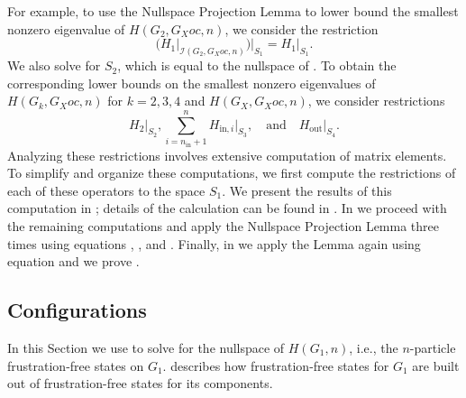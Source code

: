 \documentclass[../thesis-main/thesis-main]{subfiles}
\begin{document}
For example, to use the Nullspace Projection Lemma to lower bound the smallest nonzero eigenvalue of $H(G_{2},G_Xoc,n)$, we consider the restriction 
\begin{equation}
  \Big(H_{1}\big|_{\mathcal{I}(G_{2},G_Xoc,n)}\Big)\Big|_{S_{1}}
  =H_{1}\big|_{S_{1}}.\label{eq:H1_restriction}
\end{equation}
We also solve for $S_2$, which is equal to the nullspace of . To obtain the corresponding lower bounds on the smallest nonzero eigenvalues of $H(G_{k},G_Xoc,n)$ for $k=2,3,4$ and $H(G_X,G_Xoc,n)$, we consider restrictions 
\[
  H_{2}\big|_{S_{2}},
  \sum_{i=n_{\text{in}}+1}^{n}H_{\text{in},i}\big|_{S_{3}},\quad\text{and}\quad
  H_{\text{out}}\big|_{S_{4}}.
\]
Analyzing these restrictions involves extensive computation of matrix elements. To simplify and organize these computations, we first compute the restrictions of each of these operators to the space $S_{1}$. We present the results of this computation in ; details of the calculation can be found in . In  we proceed with the remaining computations and apply the Nullspace Projection Lemma three times using equations , , and . Finally, in  we apply the Lemma again using equation  and we prove .



\subsection{Configurations}

In this Section we use  to solve for the nullspace of $H(G_{1},n)$, i.e., the $n$-particle frustration-free states on $G_{1}$.  describes how frustration-free states for $G_1$ are built out of frustration-free states for its components.
\end{document}
